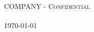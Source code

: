 
\begin{center}
{ \begin{spacing}{1.1}\huge \bfseries \hmwkTitle\\[0.3cm]\end{spacing}}
\textsc{\large COMPANY - Confidential}\\[0.5cm]
{\large \hmwkAuthorName}\\[.1cm]
{\large \today}

\end{center}



%


